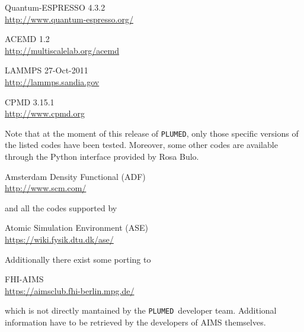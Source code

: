 \documentclass[12pt,fleqn]{report}
\newcommand{\plumed}{{\tt PLUMED}}
\begin{document}
\vspace{0.3cm}

Quantum-ESPRESSO 4.3.2   \\  \url{http://www.quantum-espresso.org/}

\vspace{0.3cm}

ACEMD 1.2    \\  \url{http://multiscalelab.org/acemd}

\vspace{0.3cm}

LAMMPS 27-Oct-2011 \\ \url{http://lammps.sandia.gov}

\vspace{0.3cm}

CPMD 3.15.1 \\ \url{http://www.cpmd.org}

\vspace{0.3cm}
Note that at the moment of this release of \plumed, only those specific versions of the listed codes
have been tested.
Moreover, some other codes are available through the Python interface provided by Rosa Bulo.
\vspace{0.3cm}

Amsterdam Density Functional (ADF) \\ \url{http://www.scm.com/}

\vspace{0.3cm}

and all the codes supported by 

\vspace{0.3cm}

Atomic Simulation Environment (ASE) \\ \url{https://wiki.fysik.dtu.dk/ase/}

\vspace{0.3cm}

Additionally there exist some porting to  

\vspace{0.3cm}

FHI-AIMS \\ \url{https://aimsclub.fhi-berlin.mpg.de/}

\vspace{0.3cm}

which is not directly mantained by  the \plumed\ developer team. Additional information have to be 
retrieved by the developers of AIMS themselves.  
\end{document}
